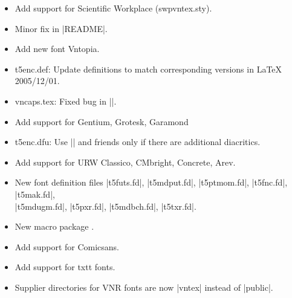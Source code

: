 \begin{releasenotes}
\begin{itemize}
  \item Add support for Scientific Workplace (swpvntex.sty).
\end{itemize}

\begin{itemize}
\item Minor fix in |README|.
\end{itemize}

\begin{itemize}
\item Add new font Vntopia.
\item t5enc.def:  Update definitions to match corresponding versions in
  LaTeX 2005/12/01.
\end{itemize}

\begin{itemize}
  \item vncaps.tex: Fixed bug in |\indexname|.
  \item Add support for Gentium, Grotesk, Garamond
  \item t5enc.dfu: Use |\ACIRCUMFLEX| and
    friends only if there are additional diacritics.
  \item Add support for URW Classico, CMbright, Concrete, Arev.
  \item New font definition files |t5futs.fd|, |t5mdput.fd|,
    |t5ptmom.fd|, |t5fnc.fd|, |t5mak.fd|,\\ |t5mdugm.fd|, |t5pxr.fd|,
    |t5mdbch.fd|, |t5txr.fd|.
  \item New macro package .
  \item Add support for Comicsans.
  \item Add support for txtt fonts.
  \item Supplier directories for VNR fonts are now |vntex| instead of
    |public|.
\end{itemize}

\newpage


\end{releasenotes}

